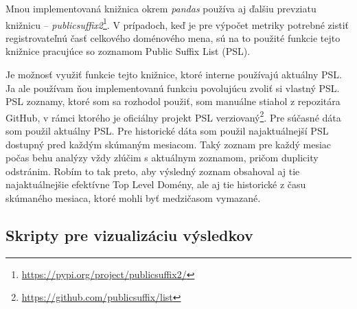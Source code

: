 Mnou implementovaná knižnica  okrem \textit{pandas} používa aj ďalšiu prevziatu knižnicu -- \textit{publicsuffix2}\footnote{\href{https://pypi.org/project/publicsuffix2/}{https://pypi.org/project/publicsuffix2/}}.
V prípadoch, keď je pre výpočet metriky potrebné zistiť registrovateľnú časť celkového doménového mena,
sú na to použité funkcie tejto knižnice pracujúce so zoznamom Public Suffix List (PSL).

Je možnosť využiť funkcie tejto knižnice, ktoré interne používajú aktuálny PSL.
Ja ale používam ňou implementovanú funkciu povolujúcu zvoliť si vlastný PSL.
PSL zoznamy, ktoré som sa rozhodol použiť, som manuálne stiahol z repozitára GitHub, v rámci ktorého je oficiálny projekt PSL verziovaný\footnote{\href{https://github.com/publicsuffix/list}{https://github.com/publicsuffix/list}}. 
Pre súčasné dáta som použil aktuálny PSL.
Pre historické dáta som použil najaktuálnejší PSL dostupný pred každým skúmaným mesiacom.
Taký zoznam pre každý mesiac počas behu analýzy vždy zlúčim s aktuálnym zoznamom, pričom duplicity odstránim.
Robím to tak preto, aby výsledný zoznam obsahoval aj tie najaktuálnejšie efektívne Top Level Domény, ale aj tie historické z času skúmaného mesiaca, ktoré mohli byť medzičasom vymazané.


\subsection{Skripty pre vizualizáciu výsledkov}

